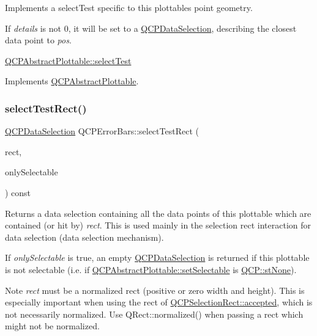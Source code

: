 Implements a select\+Test specific to this plottable\textquotesingle{}s point geometry.

If {\itshape details} is not 0, it will be set to a \hyperlink{classQCPDataSelection}{Q\+C\+P\+Data\+Selection}, describing the closest data point to {\itshape pos}.

\hyperlink{classQCPAbstractPlottable_addb3f5c41f007a78c3e142cc605bc712}{Q\+C\+P\+Abstract\+Plottable\+::select\+Test} 

Implements \hyperlink{classQCPAbstractPlottable_addb3f5c41f007a78c3e142cc605bc712}{Q\+C\+P\+Abstract\+Plottable}.

\mbox{\label{classQCPErrorBars_ad7c727736599dfb173f0952082e1a5b6}} 
\subsubsection{\texorpdfstring{select\+Test\+Rect()}{selectTestRect()}}
{\footnotesize\ttfamily \hyperlink{classQCPDataSelection}{Q\+C\+P\+Data\+Selection} Q\+C\+P\+Error\+Bars\+::select\+Test\+Rect (\begin{DoxyParamCaption}\item[{const Q\+RectF \&}]{rect,  }\item[{bool}]{only\+Selectable }\end{DoxyParamCaption}) const\hspace{0.3cm}{\ttfamily [virtual]}}





Returns a data selection containing all the data points of this plottable which are contained (or hit by) {\itshape rect}. This is used mainly in the selection rect interaction for data selection (data selection mechanism).

If {\itshape only\+Selectable} is true, an empty \hyperlink{classQCPDataSelection}{Q\+C\+P\+Data\+Selection} is returned if this plottable is not selectable (i.\+e. if \hyperlink{classQCPAbstractPlottable_ac238d6e910f976f1f30d41c2bca44ac3}{Q\+C\+P\+Abstract\+Plottable\+::set\+Selectable} is \hyperlink{namespaceQCP_ac6cb9db26a564b27feda362a438db038aa64628e338a2dd1e6f0dc84dec0b63fe}{Q\+C\+P\+::st\+None}).

\begin{DoxyNote}{Note}
{\itshape rect} must be a normalized rect (positive or zero width and height). This is especially important when using the rect of \hyperlink{classQCPSelectionRect_a15a43542e1f7b953a44c260b419e6d2c}{Q\+C\+P\+Selection\+Rect\+::accepted}, which is not necessarily normalized. Use {\ttfamily Q\+Rect\+::normalized()} when passing a rect which might not be normalized. 
\end{DoxyNote}


